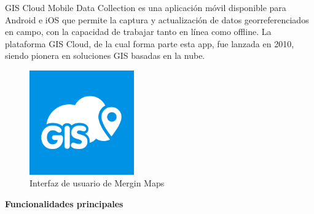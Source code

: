 \documentclass[12pt, a4paper]{book}
\begin{document}
GIS Cloud Mobile Data Collection \cite{giscloudhow} es una aplicación móvil disponible para Android e iOS que permite la captura y actualización de datos georreferenciados en campo, con la capacidad de trabajar tanto en línea como offline. La plataforma GIS Cloud, de la cual forma parte esta app, fue lanzada en 2010, siendo pionera en soluciones GIS basadas en la nube.

\begin{figure}[h]
  \centering
  \includegraphics[width=0.4\textwidth]{images/gis_cloud.png}
  \caption{Interfaz de usuario de Mergin Maps}
  \label{fig:giscloud}
\end{figure}

\textbf{Funcionalidades principales}
\end{document}
